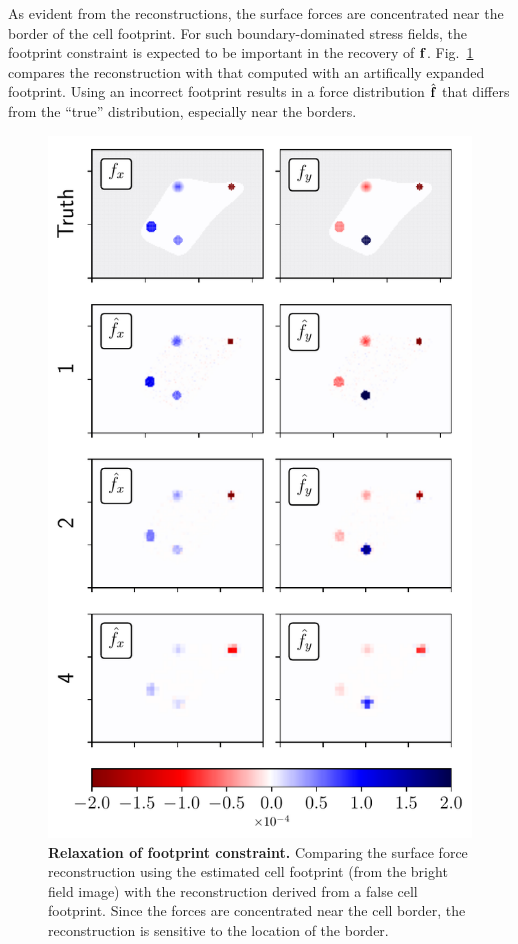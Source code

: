 \documentclass[aps,prl,reprint,twocolumn,groupedaddress,showpacs]{revtex4}
\def\f{{\bf f}}
\begin{document}
As evident from the reconstructions, the surface forces are
concentrated near the border of the cell footprint. For such
boundary-dominated stress fields, the footprint constraint is expected
to be important in the recovery of $\f$. Fig.~\ref{DATA3} compares the
reconstruction with that computed with an artifically expanded
footprint. Using an incorrect footprint results in a force
distribution $\hat{\f}$ that differs from the ``true'' distribution,
especially near the borders.
\begin{figure}
\includegraphics[width=\linewidth]{fig4}
\caption{\textbf{Relaxation of footprint constraint.} Comparing the
  surface force reconstruction using the estimated cell footprint
  (from the bright field image) with the reconstruction derived from a
  false cell footprint. Since the forces are concentrated near the
  cell border, the reconstruction is sensitive to the location of the
  border.}
\label{DATA3}
\end{figure}
\end{document}
